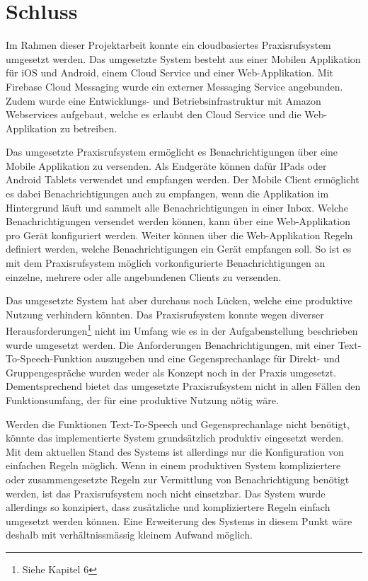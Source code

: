 \section {Schluss}

Im Rahmen dieser Projektarbeit konnte ein cloudbasiertes Praxisrufsystem umgesetzt werden.
Das umgesetzte System besteht aus einer Mobilen Applikation für iOS und Android, einem Cloud Service und einer Web-Applikation.
Mit Firebase Cloud Messaging wurde ein externer Messaging Service angebunden.
Zudem wurde eine Entwicklungs- und Betriebsinfrastruktur mit Amazon Webservices aufgebaut, welche es erlaubt den Cloud Service und die Web-Applikation zu betreiben.

Das umgesetzte Praxisrufsystem ermöglicht es Benachrichtigungen über eine Mobile Applikation zu versenden.
Als Endgeräte können dafür IPads oder Android Tablets verwendet und empfangen werden.
Der Mobile Client ermöglicht es dabei Benachrichtigungen auch zu empfangen, wenn die Applikation im Hintergrund läuft und sammelt alle Benachrichtigungen in einer Inbox.
Welche Benachrichtigungen versendet werden können, kann über eine Web-Applikation pro Gerät konfiguriert werden.
Weiter können über die Web-Applikation Regeln definiert werden, welche Benachrichtigungen ein Gerät empfangen soll.
So ist es mit dem Praxisrufsystem möglich vorkonfigurierte Benachrichtigungen an einzelne, mehrere oder alle angebundenen Clients zu versenden.

Das umgesetzte System hat aber durchaus noch Lücken, welche eine produktive Nutzung verhindern könnten.
Das Praxisrufsystem konnte wegen diverser Herausforderungen\footnote{Siehe Kapitel 6} nicht im Umfang wie es in der Aufgabenstellung beschrieben wurde umgesetzt werden.
Die Anforderungen Benachrichtigungen, mit einer Text-To-Speech-Funktion auszugeben und eine Gegensprechanlage für Direkt- und Gruppengespräche wurden weder als Konzept noch in der Praxis umgesetzt.
Dementsprechend bietet das umgesetzte Praxisrufsystem nicht in allen Fällen den Funktionsumfang, der für eine produktive Nutzung nötig wäre.

Werden die Funktionen Text-To-Speech und Gegensprechanlage nicht benötigt, könnte das implementierte System grundsätzlich produktiv eingesetzt werden.
Mit dem aktuellen Stand des Systems ist allerdings nur die Konfiguration von einfachen Regeln möglich.
Wenn in einem produktiven System kompliziertere oder zusammengesetzte Regeln zur Vermittlung von Benachrichtigung benötigt werden, ist das Praxisrufsystem noch nicht einsetzbar.
Das System wurde allerdings so konzipiert, dass zusätzliche und kompliziertere Regeln einfach umgesetzt werden können.
Eine Erweiterung des Systems in diesem Punkt wäre deshalb mit verhältnissmässig kleinem Aufwand möglich.

